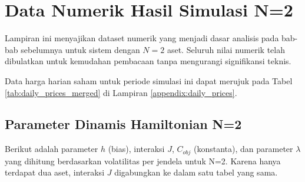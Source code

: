 \chapter{Data Numerik Hasil Simulasi N=2}
\label{appendix:numerical_data_n2}

Lampiran ini menyajikan dataset numerik yang menjadi dasar analisis pada bab-bab sebelumnya untuk sistem dengan $N=2$ aset. Seluruh nilai numerik telah dibulatkan untuk kemudahan pembacaan tanpa mengurangi signifikansi teknis.

Data harga harian saham untuk periode simulasi ini dapat merujuk pada Tabel \ref{tab:daily_prices_merged} di Lampiran \ref{appendix:daily_prices}.

\section{Parameter Dinamis Hamiltonian N=2}

Berikut adalah parameter $h$ (bias), interaksi $J$, $C_{obj}$ (konstanta), dan parameter $\lambda$ yang dihitung berdasarkan volatilitas per jendela untuk N=2. Karena hanya terdapat dua aset, interaksi $J$ digabungkan ke dalam satu tabel yang sama.

